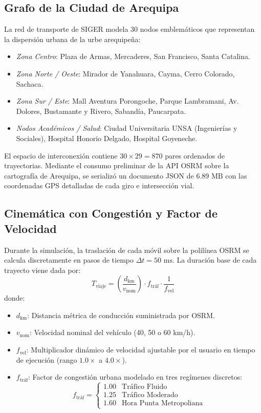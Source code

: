 \documentclass[conference]{IEEEtran}
\begin{document}
\subsection{Grafo de la Ciudad de Arequipa}
La red de transporte de SIGER modela 30 nodos emblemáticos que representan la dispersión urbana de la urbe arequipeña:
\begin{itemize}
    \item \textit{Zona Centro}: Plaza de Armas, Mercaderes, San Francisco, Santa Catalina.
    \item \textit{Zona Norte / Oeste}: Mirador de Yanahuara, Cayma, Cerro Colorado, Sachaca.
    \item \textit{Zona Sur / Este}: Mall Aventura Porongoche, Parque Lambramani, Av. Dolores, Bustamante y Rivero, Sabandía, Paucarpata.
    \item \textit{Nodos Académicos / Salud}: Ciudad Universitaria UNSA (Ingenierías y Sociales), Hospital Honorio Delgado, Hospital Goyeneche.
\end{itemize}

El espacio de interconexión contiene $30 \times 29 = 870$ pares ordenados de trayectorias. Mediante el consumo preliminar de la API OSRM sobre la cartografía de Arequipa, se serializó un documento JSON de 6.89 MB con las coordenadas GPS detalladas de cada giro e intersección vial.

\subsection{Cinemática con Congestión y Factor de Velocidad}
Durante la simulación, la traslación de cada móvil sobre la polilínea OSRM se calcula discretamente en pasos de tiempo $\Delta t = 50\text{ ms}$. La duración base de cada trayecto viene dada por:
\begin{equation}
T_{\text{viaje}} = \left( \frac{d_{\text{km}}}{v_{\text{nom}}} \right) \cdot f_{\text{tráf}} \cdot \frac{1}{f_{\text{vel}}}
\end{equation}
donde:
\begin{itemize}
    \item $d_{\text{km}}$: Distancia métrica de conducción suministrada por OSRM.
    \item $v_{\text{nom}}$: Velocidad nominal del vehículo (40, 50 o 60 km/h).
    \item $f_{\text{vel}}$: Multiplicador dinámico de velocidad ajustable por el usuario en tiempo de ejecución (rango $1.0\times$ a $4.0\times$).
    \item $f_{\text{tráf}}$: Factor de congestión urbana modelado en tres regímenes discretos:
    \begin{equation}
    f_{\text{tráf}} = \begin{cases}
    1.00 & \text{Tráfico Fluido} \\
    1.25 & \text{Tráfico Moderado} \\
    1.60 & \text{Hora Punta Metropoliana}
    \end{cases}
    \end{equation}
\end{itemize}
\end{document}
